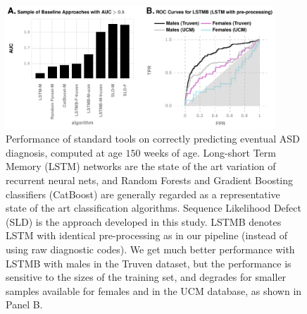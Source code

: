 \documentclass[onecolumn,,10pt]{IEEEtran}
\renewcommand{\captionN}[1]{\caption{\color{CadetBlue4!80!black} \sffamily \fontsize{9}{10}\selectfont #1  }}
\newif\iftikzX
\newif\ifFIGS
\begin{document}
\begin{figure}[t]
  \tikzexternalenable 
    \def\TEXTCOL{gray}
    \def\MXCOL{black}
    \centering

   \iftikzX

\else
  \includegraphics[width=0.9\textwidth]{Figures/External/stdtools}
  \fi 
  \captionN{Performance of standard tools on correctly predicting eventual ASD diagnosis, computed at age $150$ weeks of age. Long-short Term Memory (LSTM) networks are the state of the art variation of recurrent neural nets, and Random Forests and Gradient Boosting classifiers (CatBoost) are generally regarded as a representative state of the art classification algorithms. Sequence Likelihood Defect (SLD) is the approach developed in this study. LSTMB denotes LSTM with identical pre-processing as in our pipeline (instead of using raw diagnostic codes). We get much better performance with LSTMB with males in the Truven dataset, but the performance is sensitive to the sizes of the training set, and degrades for smaller samples available for females and in the UCM database, as shown in Panel B.}\label{EXT-figcompwsoa}
\end{figure}
\else
{}\label{EXT-figcompwsoa}
\fi
\ifFIGS
\end{document}
